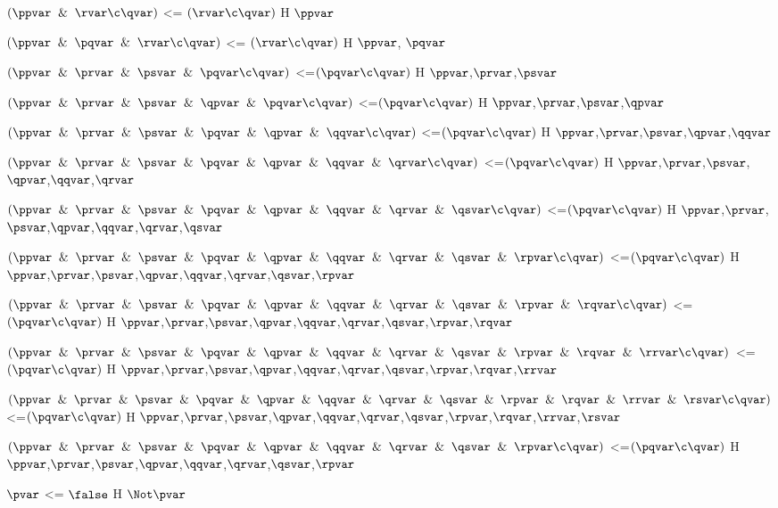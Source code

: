 $(\ppvar \And \rvar\c \qvar)$ <= $(\rvar \c \qvar)$ H $\ppvar$

$(\ppvar \And \pqvar \And \rvar \c \qvar)$ <= $(\rvar\c\qvar)$ H $\ppvar$, $\pqvar$ 

$(\ppvar \And \prvar \And \psvar\And \pqvar \c \qvar)$ <=$(\pqvar \c \qvar)$ H $\ppvar$,$\prvar$,$\psvar$

$(\ppvar \And \prvar \And\psvar\And \qpvar \And \pqvar \c \qvar)$ <=$(\pqvar \c \qvar)$ H $\ppvar$,$\prvar$,$\psvar$,$\qpvar$

$(\ppvar \And \prvar \And \psvar\And \pqvar \And \qpvar \And \qqvar \c \qvar)$ <=$(\pqvar \c \qvar)$ H $\ppvar$,$\prvar$,$\psvar$,$\qpvar$,$\qqvar$

$(\ppvar \And \prvar \And \psvar\And \pqvar \And \qpvar \And \qqvar \And \qrvar \c \qvar)$ <=$(\pqvar \c \qvar)$ H $\ppvar$,$\prvar$,$\psvar$,$\qpvar$,$\qqvar$,$\qrvar$

$(\ppvar \And \prvar \And \psvar\And \pqvar \And \qpvar \And \qqvar \And \qrvar \And \qsvar \c \qvar)$ <=$(\pqvar \c \qvar)$ H $\ppvar$,$\prvar$,$\psvar$,$\qpvar$,$\qqvar$,$\qrvar$,$\qsvar$

$(\ppvar \And \prvar \And \psvar\And \pqvar \And \qpvar \And \qqvar \And \qrvar \And \qsvar \And \rpvar \c \qvar)$ <=$(\pqvar \c \qvar)$ H $\ppvar$,$\prvar$,$\psvar$,$\qpvar$,$\qqvar$,$\qrvar$,$\qsvar$,$\rpvar$

$(\ppvar \And \prvar \And \psvar\And \pqvar \And \qpvar \And \qqvar \And \qrvar \And \qsvar \And \rpvar \And \rqvar\c \qvar)$ <=$(\pqvar \c \qvar)$ H $\ppvar$,$\prvar$,$\psvar$,$\qpvar$,$\qqvar$,$\qrvar$,$\qsvar$,$\rpvar$,$\rqvar$

$(\ppvar \And \prvar \And \psvar\And \pqvar \And \qpvar \And \qqvar \And \qrvar \And \qsvar \And \rpvar \And\rqvar\And\rrvar\c \qvar)$ <=$(\pqvar \c \qvar)$ H $\ppvar$,$\prvar$,$\psvar$,$\qpvar$,$\qqvar$,$\qrvar$,$\qsvar$,$\rpvar$,$\rqvar$,$\rrvar$

$(\ppvar \And \prvar \And \psvar\And \pqvar \And \qpvar \And \qqvar \And \qrvar \And \qsvar \And \rpvar \And \rqvar\And\rrvar\And\rsvar\c \qvar)$ <=$(\pqvar \c \qvar)$ H $\ppvar$,$\prvar$,$\psvar$,$\qpvar$,$\qqvar$,$\qrvar$,$\qsvar$,$\rpvar$,$\rqvar$,$\rrvar$,$\rsvar$

$(\ppvar \And \prvar \And \psvar\And \pqvar \And \qpvar \And \qqvar \And \qrvar \And \qsvar \And \rpvar \c \qvar)$ <=$(\pqvar \c \qvar)$ H $\ppvar$,$\prvar$,$\psvar$,$\qpvar$,$\qqvar$,$\qrvar$,$\qsvar$,$\rpvar$

$\pvar$ <= $\false$ H $\Not \pvar$ 

